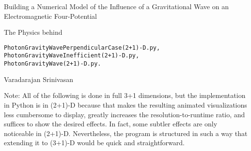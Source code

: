 \documentclass{article}
\begin{document}
\begin{flushleft}
{\large Building a Numerical Model of the Influence of a Gravitational Wave on an Electromagnetic Four-Potential}
\end{flushleft}
The Physics behind
\vspace{-2ex}
\begin{verbatim}
PhotonGravityWavePerpendicularCase(2+1)-D.py,
PhotonGravityWaveInefficient(2+1)-D.py,
PhotonGravityWave(2+1)-D.py.
\end{verbatim}
\begin{flushright}
\bigskip
Varadarajan Srinivasan
\end{flushright}
\setlength{\rightskip}{1cm}
\setlength{\leftskip}{1cm}
Note: All of the following is done in full 3+1 dimensions, but the implementation in Python is in (2+1)-D because that makes the resulting animated visualizations less cumbersome to display, greatly increases the resolution-to-runtime ratio, and suffices to show the desired effects. In fact, some subtler effects are only noticeable in (2+1)-D. Nevertheless, the program is structured in such a way that extending it to (3+1)-D would be quick and straightforward.

\setlength{\leftskip}{0pt}
\setlength{\rightskip}{0pt}

\bigskip
\end{document}

